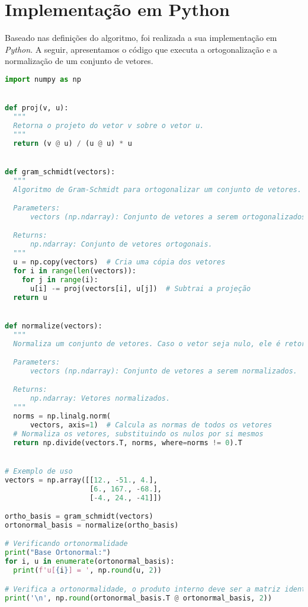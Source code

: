 \section{Implementação em Python}

Baseado nas definições do algoritmo, foi realizada a sua implementação em \textit{Python}. A seguir, apresentamos o código que executa a ortogonalização e a normalização de um conjunto de vetores.

\vspace{8pt}
\begin{lstlisting}[language=Python, caption={Implementação do algoritmo de Gram-Schmidt para ortogonalização e normalização de vetores.}]
import numpy as np


def proj(v, u):
  """
  Retorna o projeto do vetor v sobre o vetor u.
  """
  return (v @ u) / (u @ u) * u


def gram_schmidt(vectors):
  """
  Algoritmo de Gram-Schmidt para ortogonalizar um conjunto de vetores.

  Parameters:
      vectors (np.ndarray): Conjunto de vetores a serem ortogonalizados.

  Returns:
      np.ndarray: Conjunto de vetores ortogonais.
  """
  u = np.copy(vectors)  # Cria uma cópia dos vetores
  for i in range(len(vectors)):
    for j in range(i):
      u[i] -= proj(vectors[i], u[j])  # Subtrai a projeção
  return u


def normalize(vectors):
  """
  Normaliza um conjunto de vetores. Caso o vetor seja nulo, ele é retornado sem alterações.

  Parameters:
      vectors (np.ndarray): Conjunto de vetores a serem normalizados.

  Returns:
      np.ndarray: Vetores normalizados.
  """
  norms = np.linalg.norm(
      vectors, axis=1)  # Calcula as normas de todos os vetores
  # Normaliza os vetores, substituindo os nulos por si mesmos
  return np.divide(vectors.T, norms, where=norms != 0).T


# Exemplo de uso
vectors = np.array([[12., -51., 4.],
                    [6., 167., -68.],
                    [-4., 24., -41]])

ortho_basis = gram_schmidt(vectors)
ortonormal_basis = normalize(ortho_basis)

# Verificando ortonormalidade
print("Base Ortonormal:")
for i, u in enumerate(ortonormal_basis):
  print(f'u[{i}] = ', np.round(u, 2))

# Verifica a ortonormalidade, o produto interno deve ser a matriz identidade
print('\n', np.round(ortonormal_basis.T @ ortonormal_basis, 2))
\end{lstlisting}

